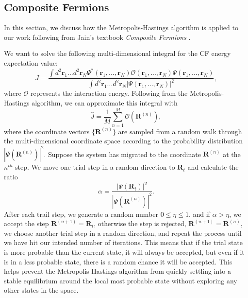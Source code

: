     \subsection{Composite Fermions} \label{ssec:compFerm}
    In this section, we discuss how the Metropolis-Hastings algorithm is applied to our work following from Jain's textbook \textit{Composite Fermions} \cite{jain}.
    
    We want to solve the following multi-dimensional integral for the CF energy expectation value:
    \begin{equation} \label{cfInt}
    J=\frac{\int d^2\mathbf{r}_1...d^2\mathbf{r}_N\Psi^*(\mathbf{r}_1,...,\mathbf{r}_N)\mathcal{O}(\mathbf{r}_1,...,\mathbf{r}_N)\Psi(\mathbf{r}_1,...,\mathbf{r}_N)}{\int d^2\mathbf{r}_1...d^2\mathbf{r}_N|\Psi(\mathbf{r}_1,...,\mathbf{r}_N)|^2},
    \end{equation}
    where $\mathcal{O}$ represents the interaction energy. Following from the Metropolis-Hastings algorithm, we can approximate this integral with
    \begin{equation} \label{metrAppr}
    \hat{J}=\frac{1}{M}\sum_{n=1}^M\mathcal{O}(\mathbf{R}^{(n)}),
    \end{equation}
    where the coordinate vectors $\{\mathbf{R}^{(n)}\}$ are sampled from a random walk through the multi-dimensional coordinate space according to the probability distribution $|\Psi(\mathbf{R}^{(n)})|^2$. Suppose the system has migrated to the coordinate $\mathbf{R}^{(n)}$ at the $n^{th}$ step. We move one trial step in a random direction to $\mathbf{R}_t$ and calculate the ratio
    \begin{equation} \label{accRati}
    \alpha=\frac{|\Psi(\mathbf{R}_t)|^2}{|\Psi(\mathbf{R}^{(n)})|^2}.
    \end{equation}
    After each trail step, we generate a random number $0\leq\eta\leq1$, and if $\alpha>\eta$, we accept the step $\mathbf{R}^{(n+1)}=\mathbf{R}_t$, otherwise the step is rejected, $\mathbf{R}^{(n+1)}=\mathbf{R}^{(n)}$, we choose another trial step in a random direction, and repeat the process until we have hit our intended number of iterations. This means that if the trial state is more probable than the current state, it will always be accepted, but even if it is in a less probable state, there is a random chance it will be accepted. This helps prevent the Metropolis-Hastings algorithm from quickly settling into a stable equilibrium around the local most probable state without exploring any other states in the space. 
    

